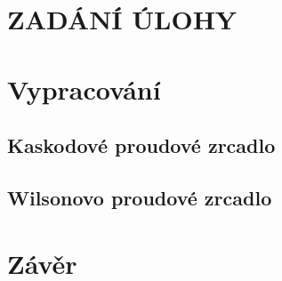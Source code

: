 \documentclass{protokol}
\begin{document}
	\maketitle

\section*{ZADÁNÍ ÚLOHY}
  
\setcounter{section}{0}

\newpage
\section{Vypracování}
  \subsection{Kaskodové proudové zrcadlo} 
  

  \newpage
  \clearpage

  \subsection{Wilsonovo proudové zrcadlo} 
  
  \newpage

\section{Závěr}
  

\end{document}
